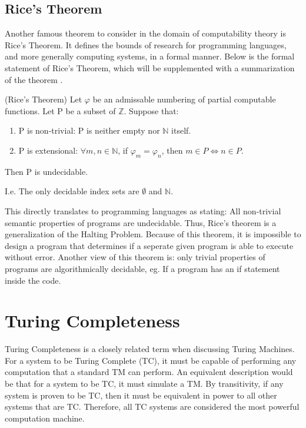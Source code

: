 \subsection{Rice's Theorem}\label{subsec:RiceThm}

Another famous theorem to consider in the domain of computability theory is Rice's Theorem.
It defines the bounds of research for programming languages, and more generally computing systems, in a formal manner.
Below is the formal statement of Rice's Theorem, which will be supplemented with a summarization of the theorem \cite{WolframRiceThm,WikiRiceThm}.

\begin{thm}
    \label{thm:RiceThm}
    (Rice's Theorem) Let $\varphi$ be an admissable numbering of partial computable functions. 
    Let P be a subset of $\mathbb{Z}$.
    Suppose that:
    \begin{enumerate}
        \item P is non-trivial: P is neither empty nor $\mathbb{N}$ itself.
        \item P is extensional: $\forall  m,n \in \mathbb{N}$, if $\varphi_{m} = \varphi_{n}$,
        then $m \in P \Leftrightarrow n \in P$.
    \end{enumerate}
    Then P is undecidable.

    I.e. The only decidable index sets are $\emptyset$ and $\mathbb{N}$.
\end{thm}

This directly translates to programming languages as stating: All non-trivial semantic properties of programs are undecidable.
Thus, Rice's theorem is a generalization of the Halting Problem.
Because of this theorem, it is impossible to design a program that determines if a seperate given program is able to execute without error.
Another view of this theorem is: only trivial properties of programs are algorithmically decidable, eg. If a program has an if statement inside the code.

\section{Turing Completeness}\label{sec:TC}

Turing Completeness is a closely related term when discussing Turing Machines.
For a system to be Turing Complete (TC), it must be capable of performing any computation that a standard TM can perform.
An equivalent description would be that for a system to be TC, it must simulate a TM.
By transitivity, if any system is proven to be TC, then it must be equivalent in power to all other systems that are TC.
Therefore, all TC systems are considered the most powerful computation machine.

